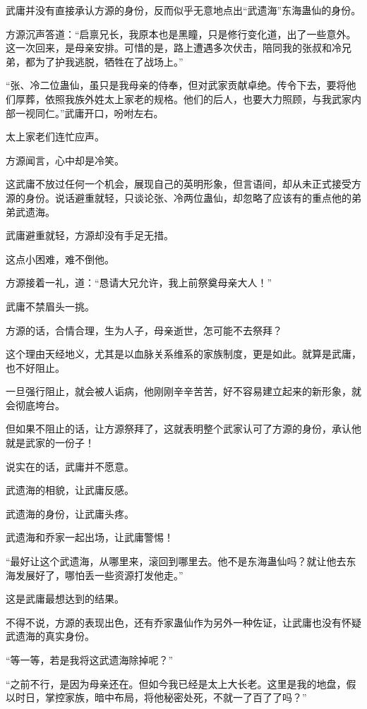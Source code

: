 \begin{this_body}
武庸并没有直接承认方源的身份，反而似乎无意地点出“武遗海”东海蛊仙的身份。

方源沉声答道：“启禀兄长，我原本也是黑瞳，只是修行变化道，出了一些意外。这一次回来，是母亲安排。可惜的是，路上遭遇多次伏击，陪同我的张叔和冷兄弟，都为了护我逃脱，牺牲在了战场上。”

“张、冷二位蛊仙，虽只是我母亲的侍奉，但对武家贡献卓绝。传令下去，要将他们厚葬，依照我族外姓太上家老的规格。他们的后人，也要大力照顾，与我武家内部一视同仁。”武庸开口，吩咐左右。

太上家老们连忙应声。

方源闻言，心中却是冷笑。

这武庸不放过任何一个机会，展现自己的英明形象，但言语间，却从未正式接受方源的身份。说话避重就轻，只谈论张、冷两位蛊仙，却忽略了应该有的重点他的弟弟武遗海。

武庸避重就轻，方源却没有手足无措。

这点小困难，难不倒他。

方源接着一礼，道：“恳请大兄允许，我上前祭奠母亲大人！”

武庸不禁眉头一挑。

方源的话，合情合理，生为人子，母亲逝世，怎可能不去祭拜？

这个理由天经地义，尤其是以血脉关系维系的家族制度，更是如此。就算是武庸，也不好阻止。

一旦强行阻止，就会被人诟病，他刚刚辛辛苦苦，好不容易建立起来的新形象，就会彻底垮台。

但如果不阻止的话，让方源祭拜了，这就表明整个武家认可了方源的身份，承认他就是武家的一份子！

说实在的话，武庸并不愿意。

武遗海的相貌，让武庸反感。

武遗海的身份，让武庸头疼。

武遗海和乔家一起出场，让武庸警惕！

“最好让这个武遗海，从哪里来，滚回到哪里去。他不是东海蛊仙吗？就让他去东海发展好了，哪怕丢一些资源打发他走。”

这是武庸最想达到的结果。

不得不说，方源的表现出色，还有乔家蛊仙作为另外一种佐证，让武庸也没有怀疑武遗海的真实身份。

“等一等，若是我将这武遗海除掉呢？”

“之前不行，是因为母亲还在。但如今我已经是太上大长老。这里是我的地盘，假以时日，掌控家族，暗中布局，将他秘密处死，不就一了百了了吗？”


\end{this_body}
